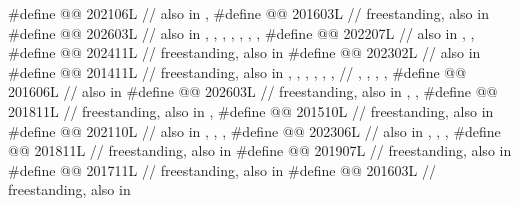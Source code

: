 \begin{codeblock}
#define @@ 202106L // also in , 
#define @@               201603L // freestanding, also in 
#define @@      202603L
  // also in , , , , , , , 
#define @@   202207L
  // also in , , 
#define @@                  202411L // freestanding, also in 
#define @@                 202302L // also in 
#define @@  201411L
  // freestanding, also in , , , , , ,
  // , , , , 
#define @@                               201606L // also in 
#define @@                             202603L
  // freestanding, also in , , 
#define @@                   201811L
  // freestanding, also in , 
#define @@                          201510L // freestanding, also in 
#define @@ 202110L
  // also in , , , 
#define @@ 202306L
  // also in , , , 
#define @@                    201811L // freestanding, also in 
#define @@                  201907L // freestanding, also in 
#define @@                      201711L // freestanding, also in 
#define @@        201603L // freestanding, also in 

\end{codeblock}
